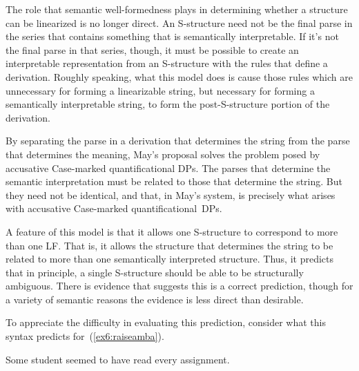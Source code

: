 The role that semantic well-formedness plays in determining whether a structure can be linearized is no longer direct. An S-structure need not be the final parse in the series that contains something that is semantically interpretable. If it's not the final parse in that series, though, it must be possible to create an interpretable representation from an S-structure with the rules that define a derivation. Roughly speaking, what this model does is cause those rules which are unnecessary for forming a linearizable string, but necessary for forming a semantically interpretable string, to form the post-S-structure portion of the derivation. 

By separating the parse in a derivation that determines the string from the parse that determines the meaning, May's proposal solves the problem posed by accusative Case-marked quantificational DPs. The parses that determine the semantic interpretation must be related to those that determine the string. But they need not be identical, and that, in May's system, is precisely what arises with accusative Case-marked quantificational~DPs.

A feature of this model is that it allows one S-structure to correspond to more than one LF. That is, it allows the structure that determines the string to be related to more than one semantically interpreted structure. Thus, it predicts that in principle, a single S-structure should be able to be structurally ambiguous. There is evidence that suggests this is a correct prediction, though for a variety of semantic reasons the evidence is less direct than desirable.

To appreciate the difficulty in evaluating this prediction, consider what this syntax predicts for~(\ref{ex6:raiseamba}).
\begin{exe}
\raggedright
	\ex \label{ex6:raiseamba}
	Some student seemed to have read every assignment.
\end{exe}
\pagebreak

